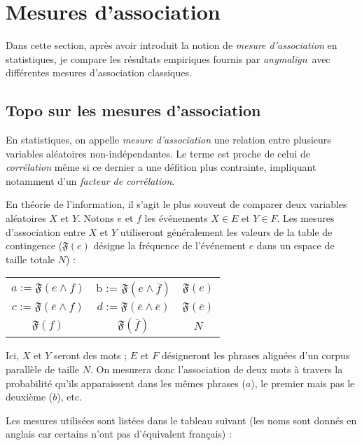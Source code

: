 \documentclass[a4paper,10pt]{article}
\newcommand{\anym}{\emph{anymalign}}
\begin{document}
\section{Mesures d'association}

Dans cette section, après avoir introduit la notion de \emph{mesure d'association} en statistiques, je compare les résultats empiriques fournis par \anym~avec différentes mesures d'association classiques.

\subsection{Topo sur les mesures d'association}

En statistiques, on appelle \emph{mesure d'association} une relation entre plusieurs variables aléatoires non-indépendantes. Le terme est proche de celui de \emph{corrélation} même si ce dernier a une défition plus contrainte, impliquant notamment d'un \emph{facteur de corrélation}.

En théorie de l'information, il s'agit le plus souvent de comparer deux variables aléatoires $X$ et $Y$. Notons $e$ et $f$ les événements $X \in E$ et $Y \in F$. Les mesures d'association entre $X$ et $Y$ utiliseront généralement les valeurs de la table de contingence ($\mathfrak{F}(e)$ désigne la fréquence de l'événement $e$ dans un espace de taille totale $N$) :

\begin{tabular}{|cc|c|}
\hline
$a := \mathfrak{F}(e\wedge f)$ & b := $\mathfrak{F}(e\wedge\overline{f})$ & $\mathfrak{F}(e)$ \\
$c := \mathfrak{F}(\overline{e}\wedge f)$ & $d := \mathfrak{F}(\overline{e}\wedge\overline{e})$ & $\mathfrak{F}(\overline{e})$ \\
\hline
$\mathfrak{F}(f)$ & $\mathfrak{F}(\overline{f})$ & $N$ \\
\hline
\end{tabular}


Ici, $X$ et $Y$ seront des mots ; $E$ et $F$ désigneront les phrases alignées d'un corpus parallèle de taille $N$. On mesurera donc l'association de deux mots à travers la probabilité qu'ils apparaissent dans les mêmes phrases ($a$), le premier mais pas le deuxième ($b$), etc.

Les mesures utilisées sont listées dans le tableau suivant (les noms sont donnés en anglais car certains n'ont pas d'équivalent français) :
\end{document}
